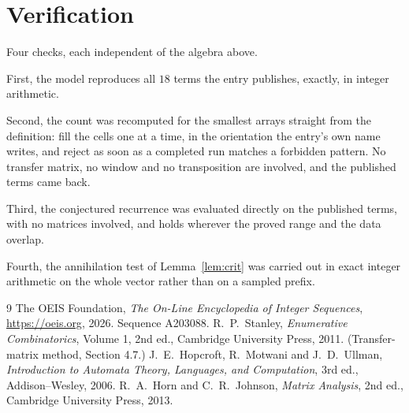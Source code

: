 \documentclass[11pt,a4paper]{article}
\theoremstyle{plain}
\theoremstyle{definition}
\begin{document}
\section{Verification}

Four checks, each independent of the algebra above.

First, the model reproduces all $18$ terms the entry publishes, exactly, in integer
arithmetic.

Second, the count was recomputed for the smallest arrays straight from the definition: fill the
cells one at a time, in the orientation the entry's own name writes, and reject as soon as a
completed run matches a forbidden pattern. No transfer matrix, no window and no transposition
are involved, and the published terms came back.

Third, the conjectured recurrence was evaluated directly on the published terms, with no
matrices involved, and holds wherever the proved range and the data overlap.

Fourth, the annihilation test of Lemma~\ref{lem:crit} was carried out in exact integer
arithmetic on the whole vector rather than on a sampled prefix.

\begin{thebibliography}{9}
 The OEIS Foundation, \emph{The On-Line Encyclopedia of Integer
Sequences}, \url{https://oeis.org}, 2026. Sequence A203088.
 R.~P.~Stanley, \emph{Enumerative Combinatorics}, Volume 1, 2nd ed.,
Cambridge University Press, 2011. (Transfer-matrix method, Section 4.7.)
 J.~E.~Hopcroft, R.~Motwani and J.~D.~Ullman, \emph{Introduction to Automata
Theory, Languages, and Computation}, 3rd ed., Addison--Wesley, 2006.
 R.~A.~Horn and C.~R.~Johnson, \emph{Matrix Analysis}, 2nd ed., Cambridge
University Press, 2013.
\end{thebibliography}
\end{document}
